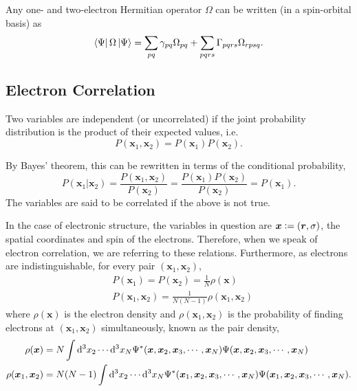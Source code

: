 Any one- and two-electron Hermitian operator $\Omega$ can be written (in a spin-orbital basis) as
\begin{equation}
    \label{eq:rdm-expectation}
    \bra{\Psi}\Omega\ket{\Psi} = \sum_{pq} \gamma_{pq}\Omega_{pq} + \sum_{pqrs} \Gamma_{pqrs}\Omega_{rpsq}.
\end{equation}

\subsection{Electron Correlation}
\label{sec:correlation}

Two variables are independent (or uncorrelated) if the joint probability distribution is the product of their expected values, i.e.
\begin{equation}
    P(\bm x_1, \bm x_2) = P(\bm x_1)P(\bm x_2).
\end{equation}

By Bayes' theorem,\cite{hastieElements2009b,bayesLII1997} this can be rewritten in terms of the conditional probability,
\begin{equation}
    P(\bm x_1|\bm x_2) = \frac{P(\bm x_1, \bm x_2)}{P(\bm x_2)} = \frac{P(\bm x_1)P(\bm x_2)}{P(\bm x_2)} = P(\bm x_1).
\end{equation}
The variables are said to be correlated if the above is not true.

In the case of electronic structure, the variables in question are $\bm x \mathrel{\mathop:}= (\bm r, \sigma)$, the spatial coordinates and spin of the electrons. Therefore, when we speak of electron correlation, we are referring to these relations. Furthermore, as electrons are indistinguishable, for every pair $(\bm x_1, \bm x_2)$,
\begin{align}
    &P(\bm x_1) = P(\bm x_2) = \frac 1N \rho(\bm x) \\
    &P(\bm x_1, \bm x_2) = \frac 1{N(N-1)} \rho(\bm x_1, \bm x_2)
\end{align}
where $\rho(\bm x)$ is the electron density and $\rho(\bm x_1, \bm x_2)$ is the probability of finding electrons at $(\bm x_1, \bm x_2)$ simultaneously, known as the pair density,
\begin{align}
    \rho(\bm x) &= N\int \mathrm{d}^3x_2 \cdots \mathrm{d}^3x_N \Psi^*(\bm x, \bm x_2, \bm x_3, \cdots, \bm x_N)\Psi(\bm x, \bm x_2, \bm x_3, \cdots, \bm x_N) \\
    \rho(\bm x_1, \bm x_2) &= N(N-1)\int \mathrm{d}^3x_2 \cdots \mathrm{d}^3x_N \Psi^*(\bm x_1, \bm x_2, \bm x_3, \cdots, \bm x_N)\Psi(\bm x_1, \bm x_2, \bm x_3, \cdots, \bm x_N).
\end{align}

